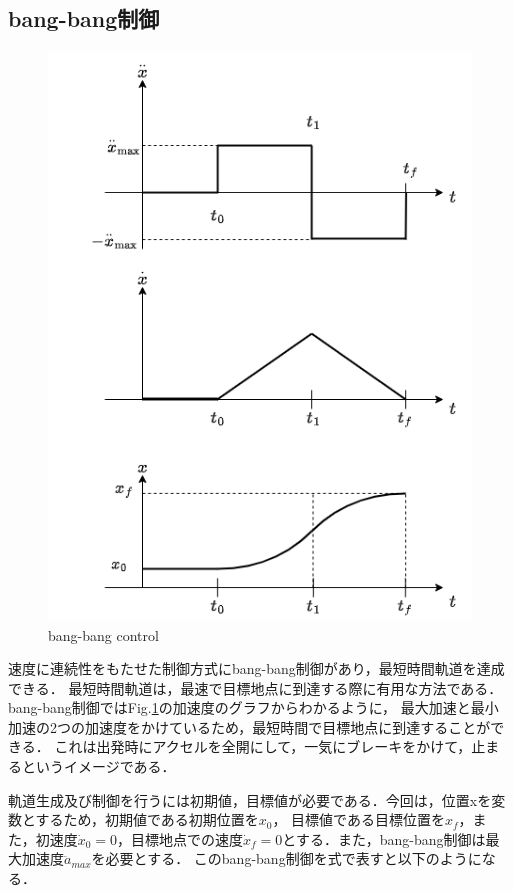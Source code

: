 
\subsection{bang-bang制御}

\begin{figure}[H]
  \centering
 \includegraphics[keepaspectratio, scale=0.8]
      {images/png/bangbang.drawio.png}
 \caption{bang-bang control}
 \label{Fig:bangbang}
\end{figure}

速度に連続性をもたせた制御方式にbang-bang制御があり，最短時間軌道を達成できる．
最短時間軌道は，最速で目標地点に到達する際に有用な方法である．
bang-bang制御ではFig.\ref{Fig:bangbang}の加速度のグラフからわかるように，
最大加速と最小加速の2つの加速度をかけているため，最短時間で目標地点に到達することができる．
これは出発時にアクセルを全開にして，一気にブレーキをかけて，止まるというイメージである．

軌道生成及び制御を行うには初期値，目標値が必要である．今回は，位置xを変数とするため，初期値である初期位置を$x_0$，
目標値である目標位置を$x_f$，また，初速度$\dot{x}_0=0$，目標地点での速度$\dot{x}_f=0$とする．また，bang-bang制御は最大加速度$\ddot{a}_{max}$を必要とする．
このbang-bang制御を式で表すと以下のようになる．

